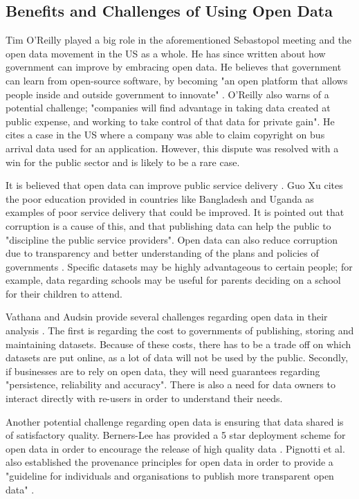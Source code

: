 \documentclass[authoryearcitations]{UoYCSproject}
\begin{document}
\subsection{Benefits and Challenges of Using Open Data}


Tim O'Reilly played a big role in the aforementioned Sebastopol meeting and the open data movement in the US as a whole. He has since written about how government can improve by embracing open data.  He believes that government can learn from open-source software, by becoming "an open platform that allows people inside and outside government to innovate" \citep{OReilly2011}. O'Reilly also warns of a potential challenge; "companies will find advantage in taking data created at public expense, and working to take control of that data for private gain". He cites a case in the US where a company was able to claim copyright on bus arrival data used for an application. However, this dispute was resolved with a win for the public sector and is likely to be a rare case.

It is believed that open data can improve public service delivery \citep{Xu2012}. Guo Xu cites the poor education provided in countries like Bangladesh and Uganda as examples of poor service delivery that could be improved. It is pointed out that corruption is a cause of this, and that publishing data can help the public to "discipline the public service providers". Open data can also reduce corruption due to transparency and better understanding of the plans and policies of governments \citep{Vathana}. Specific datasets may be highly advantageous to certain people; for example, data regarding schools may be useful for parents deciding on a school for their children to attend. 

Vathana and Audsin provide several challenges regarding open data in their analysis \citep{Vathana}. The first is regarding the cost to governments of publishing, storing and maintaining datasets. Because of these costs, there has to be a trade off on which datasets are put online, as a lot of data will not be used by the public. Secondly, if businesses are to rely on open data, they will need guarantees regarding "persistence, reliability and accuracy". There is also a need for data owners to interact directly with re-users in order to understand their needs.

Another potential challenge regarding open data is ensuring that data shared is of satisfactory quality. Berners-Lee has provided a 5 star deployment scheme for open data in order to encourage the release of high quality data \citep{Berners-Lee2006}. Pignotti et al. also established the provenance principles for open data in order to provide a "guideline for individuals and organisations to publish more transparent open data" \citep{Pignotti2011}.
\end{document}
